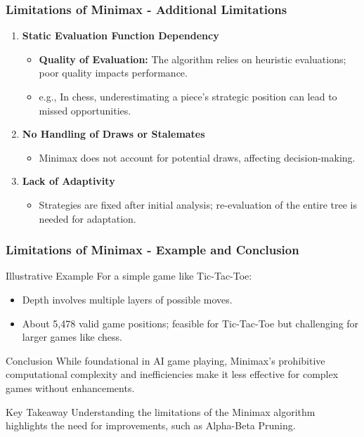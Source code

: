 \documentclass[aspectratio=169]{beamer}
\begin{document}
\begin{frame}[fragile]
    \frametitle{Limitations of Minimax - Additional Limitations}
    \begin{enumerate}[resume]
        \item \textbf{Static Evaluation Function Dependency}
        \begin{itemize}
            \item \textbf{Quality of Evaluation:} The algorithm relies on heuristic evaluations; poor quality impacts performance.
            \item e.g., In chess, underestimating a piece's strategic position can lead to missed opportunities.
        \end{itemize}

        \item \textbf{No Handling of Draws or Stalemates}
        \begin{itemize}
            \item Minimax does not account for potential draws, affecting decision-making.
        \end{itemize}

        \item \textbf{Lack of Adaptivity}
        \begin{itemize}
            \item Strategies are fixed after initial analysis; re-evaluation of the entire tree is needed for adaptation.
        \end{itemize}
    \end{enumerate}
\end{frame}

\begin{frame}[fragile]
    \frametitle{Limitations of Minimax - Example and Conclusion}
    \begin{block}{Illustrative Example}
        For a simple game like Tic-Tac-Toe:
        \begin{itemize}
            \item Depth involves multiple layers of possible moves.
            \item About 5,478 valid game positions; feasible for Tic-Tac-Toe but challenging for larger games like chess.
        \end{itemize}
    \end{block}

    \begin{block}{Conclusion}
        While foundational in AI game playing, Minimax's prohibitive computational complexity and inefficiencies make it less effective for complex games without enhancements.
    \end{block}

    \begin{block}{Key Takeaway}
        Understanding the limitations of the Minimax algorithm highlights the need for improvements, such as Alpha-Beta Pruning.
    \end{block}
\end{frame}
\end{document}
